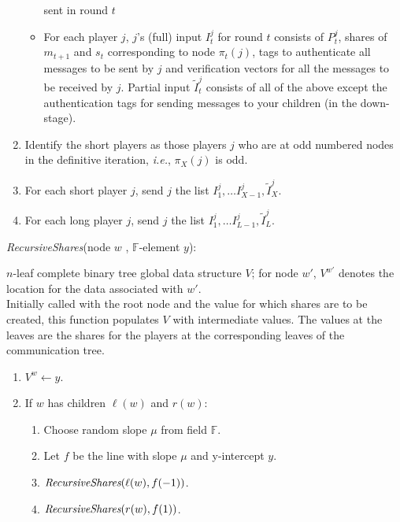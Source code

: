 \documentclass[12pt]{article}
\theoremstyle{definition}
\newcommand{\ie}{\emph{i.e.}}
\newcommand{\F}{\mathbb{F}}
\newcommand{\recursiveShares}{\emph{RecursiveShares}\xspace}
\begin{document}
\begin{algorithm}
\begin{enumerate}
\begin{itemize}
sent in round $t$
\item For each player $j$, $j$'s (full) input $I^j_t$ for round $t$  
consists of $P^j_t$, shares of $m_{t+1}$ and $s_t$ corresponding to node 
$\pi_t(j)$, tags to authenticate all messages to be sent by $j$ and 
verification vectors for all the 
messages to be received by $j$. Partial input $\tilde{I}^j_t$ consists of 
all of the above except the authentication tags for sending messages to your 
children (in the down-stage).
\end{itemize}
\item Identify the short players as those players $j$ who are at odd numbered 
nodes in the definitive iteration, \ie, $\pi_X(j)$ is odd.
\item For each short player $j$, send $j$ the list 
$I^j_1,\dots I^j_{X-1}, \tilde{I}^j_X$.
\item For each long player $j$, send $j$ the list 
$I^j_1,\dots I^j_{L-1}, \tilde{I}^j_L$.
\end{enumerate}
\end{algorithm}


\begin{algorithm}
\caption{ \recursiveShares(node $w$ , $\F$-element $y$):}\label{alg:shares}
$n$-leaf complete binary tree global data structure $V$; for node $w'$, 
$V^{w'}$ denotes the location for the data associated with $w'$.\\
Initially called with the root node and the value for which shares are to be 
created, this function populates $V$ with 
intermediate values. The values at the leaves are the shares for the players 
at the corresponding leaves of the  communication tree.
\begin{enumerate}
\item $V^w   \leftarrow y$.
\item If $w$ has children $\ell(w)$ and $r(w)$:
	\begin{enumerate}
	\item Choose random slope $\mu$ from field $\F$.
	\item Let $f$ be the line with slope $\mu$ and y-intercept $y$.
	\item $\recursiveShares(\ell(w), f(-1))$.
	\item $\recursiveShares(r(w), f(1))$.
	\end{enumerate}
\end{enumerate}
\label{alg:recursiveShares} 
\end{algorithm}
\end{document}
